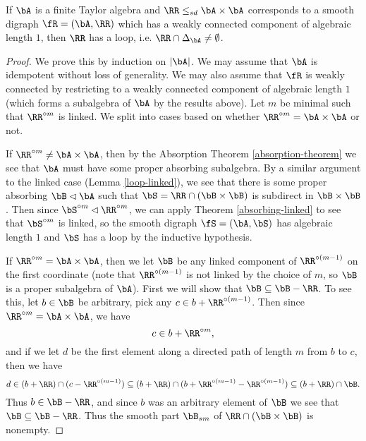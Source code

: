 \begin{thm}\label{loop-lemma} If $\bA$ is a finite Taylor algebra and $\RR \le_{sd} \bA\times \bA$ corresponds to a smooth digraph $\fR = (\bA,\RR)$ which has a weakly connected component of algebraic length $1$, then $\RR$ has a loop, i.e. $\RR \cap \Delta_{\bA} \ne \emptyset$.
\end{thm}
\begin{proof} We prove this by induction on $|\bA|$. We may assume that $\bA$ is idempotent without loss of generality. We may also assume that $\fR$ is weakly connected by restricting to a weakly connected component of algebraic length $1$ (which forms a subalgebra of $\bA$ by the results above). Let $m$ be minimal such that $\RR^{\circ m}$ is linked. We split into cases based on whether $\RR^{\circ m} = \bA \times \bA$ or not.

If $\RR^{\circ m} \ne \bA\times \bA$, then by the Absorption Theorem \ref{absorption-theorem} we see that $\bA$ must have some proper absorbing subalgebra. By a similar argument to the linked case (Lemma \ref{loop-linked}), we see that there is some proper absorbing $\bB \lhd \bA$ such that $\bS = \RR \cap (\bB\times \bB)$ is subdirect in $\bB \times \bB$. Then since $\bS^{\circ m} \lhd \RR^{\circ m}$, we can apply Theorem \ref{absorbing-linked} to see that $\bS^{\circ m}$ is linked, so the smooth digraph $\fS = (\bA,\bS)$ has algebraic length $1$ and $\bS$ has a loop by the inductive hypothesis.

If $\RR^{\circ m} = \bA\times \bA$, then we let $\bB$ be any linked component of $\RR^{\circ (m-1)}$ on the first coordinate (note that $\RR^{\circ (m-1)}$ is not linked by the choice of $m$, so $\bB$ is a proper subalgebra of $\bA$). First we will show that $\bB \subseteq \bB-\RR$. To see this, let $b \in \bB$ be arbitrary, pick any $c \in b + \RR^{\circ (m-1)}$. Then since $\RR^{\circ m} = \bA \times \bA$, we have
\[
c \in b+\RR^{\circ m},
\]
and if we let $d$ be the first element along a directed path of length $m$ from $b$ to $c$, then we have
\[
d \in (b+\RR) \cap (c - \RR^{\circ (m-1)}) \subseteq (b+\RR) \cap (b + \RR^{\circ (m-1)} - \RR^{\circ (m-1)}) \subseteq (b+\RR) \cap \bB.
\]
Thus $b \in \bB - \RR$, and since $b$ was an arbitrary element of $\bB$ we see that $\bB \subseteq \bB-\RR$. Thus the smooth part $\bB_{sm}$ of $\RR\cap (\bB\times \bB)$ is nonempty.


\end{proof}
